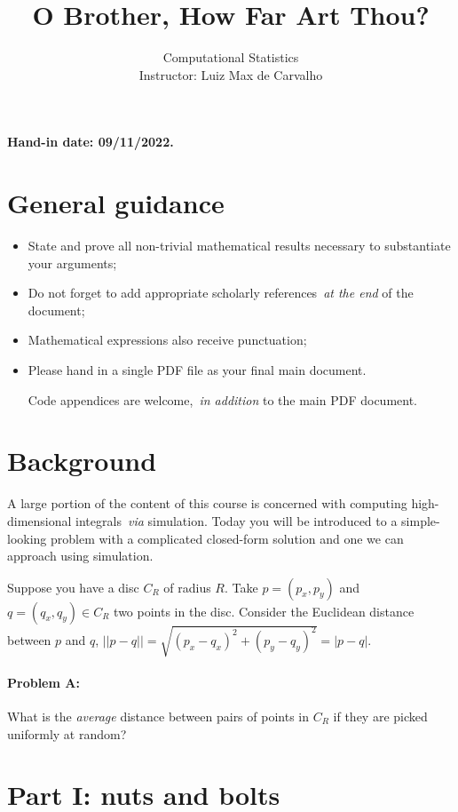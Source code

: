 \documentclass[a4paper,10pt, notitlepage]{report}
\title{O Brother, How Far Art Thou?}
\author{Computational Statistics \\ Instructor: Luiz Max de Carvalho}
\begin{document}
\maketitle

\textbf{Hand-in date: 09/11/2022.}

\section*{General guidance}
\begin{itemize}
 \item State and prove all non-trivial mathematical results necessary to substantiate your arguments;
 \item Do not forget to add appropriate scholarly references~\textit{at the end} of the document;
 \item Mathematical expressions also receive punctuation;
 \item Please hand in a single PDF file as your final main document.
 
 Code appendices are welcome,~\textit{in addition} to the main PDF document.
 \end{itemize}

\newpage

\section*{Background}

A large portion of the content of this course is concerned with computing high-dimensional integrals~\textit{via} simulation.
Today you will be introduced to a simple-looking problem with a complicated closed-form solution and one we can approach using simulation.

Suppose you have a disc $C_R$ of radius $R$. 
Take $p = (p_x, p_y)$ and $ q = (q_x, q_y) \in C_R$ two points in the disc.  
Consider the Euclidean distance between $p$  and $q$, $||p-q|| = \sqrt{(p_x-q_x)^2 + (p_y-q_y)^2} = |p-q|$.
\paragraph{Problem A:} What is the \textit{average} distance between pairs of points in $C_R$ if they are picked uniformly at random?

\section*{Part I: nuts and bolts}
\end{document}
